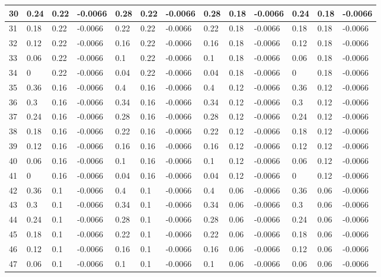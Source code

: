 \begin{footnotesize}
\begin{longtable}{|l|l|l|l|l|l|l|l|l|l|l|l|l|}
30  & 0.24 & 0.22 & -0.0066 & 0.28 & 0.22 & -0.0066 & 0.28 & 0.18 & -0.0066 & 0.24 & 0.18 & -0.0066 \\ \hline
31  & 0.18 & 0.22 & -0.0066 & 0.22 & 0.22 & -0.0066 & 0.22 & 0.18 & -0.0066 & 0.18 & 0.18 & -0.0066 \\ \hline
32  & 0.12 & 0.22 & -0.0066 & 0.16 & 0.22 & -0.0066 & 0.16 & 0.18 & -0.0066 & 0.12 & 0.18 & -0.0066 \\ \hline
33  & 0.06 & 0.22 & -0.0066 & 0.1  & 0.22 & -0.0066 & 0.1  & 0.18 & -0.0066 & 0.06 & 0.18 & -0.0066 \\ \hline
34  & 0    & 0.22 & -0.0066 & 0.04 & 0.22 & -0.0066 & 0.04 & 0.18 & -0.0066 & 0    & 0.18 & -0.0066 \\ \hline
35  & 0.36 & 0.16 & -0.0066 & 0.4  & 0.16 & -0.0066 & 0.4  & 0.12 & -0.0066 & 0.36 & 0.12 & -0.0066 \\ \hline
36  & 0.3  & 0.16 & -0.0066 & 0.34 & 0.16 & -0.0066 & 0.34 & 0.12 & -0.0066 & 0.3  & 0.12 & -0.0066 \\ \hline
37  & 0.24 & 0.16 & -0.0066 & 0.28 & 0.16 & -0.0066 & 0.28 & 0.12 & -0.0066 & 0.24 & 0.12 & -0.0066 \\ \hline
38  & 0.18 & 0.16 & -0.0066 & 0.22 & 0.16 & -0.0066 & 0.22 & 0.12 & -0.0066 & 0.18 & 0.12 & -0.0066 \\ \hline
39  & 0.12 & 0.16 & -0.0066 & 0.16 & 0.16 & -0.0066 & 0.16 & 0.12 & -0.0066 & 0.12 & 0.12 & -0.0066 \\ \hline
40  & 0.06 & 0.16 & -0.0066 & 0.1  & 0.16 & -0.0066 & 0.1  & 0.12 & -0.0066 & 0.06 & 0.12 & -0.0066 \\ \hline
41  & 0    & 0.16 & -0.0066 & 0.04 & 0.16 & -0.0066 & 0.04 & 0.12 & -0.0066 & 0    & 0.12 & -0.0066 \\ \hline
42  & 0.36 & 0.1  & -0.0066 & 0.4  & 0.1  & -0.0066 & 0.4  & 0.06 & -0.0066 & 0.36 & 0.06 & -0.0066 \\ \hline
43  & 0.3  & 0.1  & -0.0066 & 0.34 & 0.1  & -0.0066 & 0.34 & 0.06 & -0.0066 & 0.3  & 0.06 & -0.0066 \\ \hline
44  & 0.24 & 0.1  & -0.0066 & 0.28 & 0.1  & -0.0066 & 0.28 & 0.06 & -0.0066 & 0.24 & 0.06 & -0.0066 \\ \hline
45  & 0.18 & 0.1  & -0.0066 & 0.22 & 0.1  & -0.0066 & 0.22 & 0.06 & -0.0066 & 0.18 & 0.06 & -0.0066 \\ \hline
46  & 0.12 & 0.1  & -0.0066 & 0.16 & 0.1  & -0.0066 & 0.16 & 0.06 & -0.0066 & 0.12 & 0.06 & -0.0066 \\ \hline
47  & 0.06 & 0.1  & -0.0066 & 0.1  & 0.1  & -0.0066 & 0.1  & 0.06 & -0.0066 & 0.06 & 0.06 & -0.0066 \\ \hline

\end{longtable}
\end{footnotesize}
